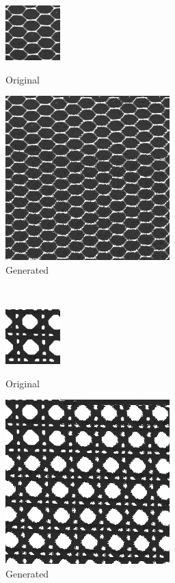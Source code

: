 \documentclass{article}
\begin{document}
    \begin{figure}[!htb]
    \begin{center}
      \includegraphics[scale=.6]{5/report/non_parametric/3.png}
      \caption{Original}
    \end{center}
    \endminipage
    \begin{center}
      \includegraphics[scale=1.0]{5/report/non_parametric/3_created.png}
      \caption{Generated}
    \end{center}
    \endminipage
    \end{figure}
\pagebreak \\

    \begin{figure}[!htb]
    \begin{center}
      \includegraphics[scale=.6]{5/report/non_parametric/4.png}
      \caption{Original}
    \end{center}
    \endminipage
    \begin{center}
      \includegraphics[scale=1.0]{5/report/non_parametric/4_created.png}
      \caption{Generated}
    \end{center}
    \endminipage
    \end{figure}
    
\end{document}
